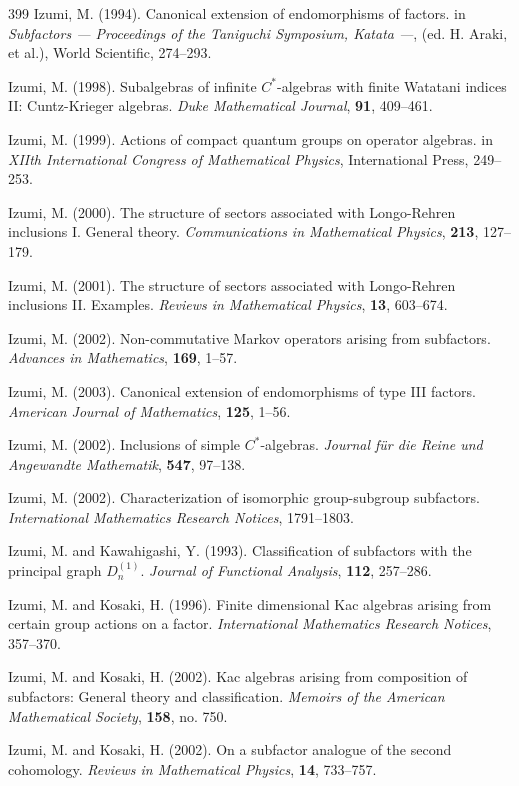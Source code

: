 \documentclass[12pt]{article}
\theoremstyle{plain}
\theoremstyle{definition}
\numberwithin{equation}{section}
\begin{document}
\begin{thebibliography} {399}
Izumi, M. (1994).
Canonical extension of endomorphisms of factors.
in {\em Subfactors --- Proceedings of the Taniguchi Symposium, Katata ---},
(ed. H. Araki, et al.), World Scientific, 274--293.

Izumi, M. (1998).
Subalgebras of infinite $C^*$-algebras with
finite Watatani indices II: Cuntz-Krieger algebras.
{\em Duke Mathematical Journal}, {\bf 91}, 409--461.

Izumi, M. (1999).
Actions of compact quantum groups on operator algebras.
in {\em XIIth International Congress of Mathematical Physics},
International Press, 249--253.

Izumi, M. (2000).
The structure of sectors associated with Longo-Rehren
inclusions I. General theory.
{\em Communications in Mathematical Physics}, {\bf 213}, 127--179.

Izumi, M. (2001).
The structure of sectors associated with Longo-Rehren
inclusions II. Examples.
{\em Reviews in Mathematical Physics}, {\bf 13}, 603--674.

Izumi, M. (2002).
Non-commutative Markov operators arising from subfactors.
{\em Advances in Mathematics}, {\bf 169}, 1--57.

Izumi, M. (2003).
Canonical extension of endomorphisms of type III factors.
{\em American Journal of Mathematics}, {\bf 125}, 1--56.

Izumi, M. (2002).
Inclusions of simple $C^*$-algebras.
{\em Journal f\"ur die Reine und Angewandte Mathematik},
{\bf 547}, 97--138.

Izumi, M. (2002).
Characterization of isomorphic group-subgroup subfactors.
{\em International Mathematics Research Notices}, 1791--1803.

Izumi, M. and Kawahigashi, Y. (1993).
Classification of subfactors with the principal graph $D^{(1)}_n$.
{\em Journal of Functional Analysis}, {\bf 112}, 257--286.

Izumi, M. and Kosaki, H. (1996).
Finite dimensional Kac algebras arising from certain
group actions on a factor.
{\em International Mathematics Research Notices}, 357--370.

Izumi, M. and Kosaki, H. (2002).
Kac algebras arising from
composition of subfactors: General theory and classification.
{\em Memoirs of the American Mathematical Society}, {\bf 158}, 
no. 750.

Izumi, M. and Kosaki, H. (2002).
On a subfactor analogue of the second cohomology.
{\em Reviews in Mathematical Physics}, {\bf 14}, 733--757.


\end{thebibliography}
\end{document}
